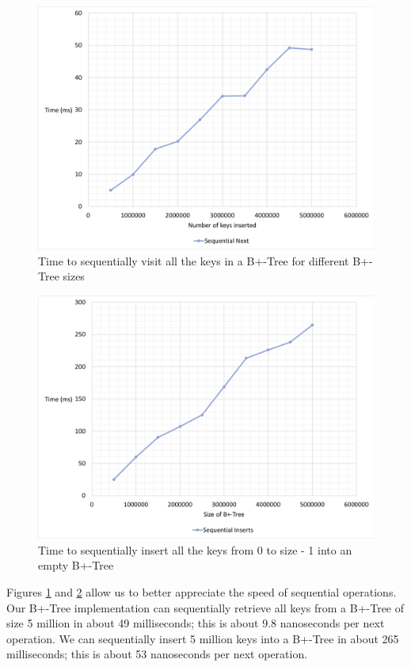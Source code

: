 \begin{figure}[htbp]
    \centering
    \includegraphics[scale=0.50]{figures/BtreeSequentialNextGraph.png}
    \caption{Time to sequentially visit all the keys in a B+-Tree for different B+-Tree sizes}
    \label{fig:B+GetsSequentialGraph}
\end{figure}

\begin{figure}[htbp]
    \centering
    \includegraphics[scale=0.50]{figures/BtreeSequentialnsertsGraph.png}
    \caption{Time to sequentially insert all the keys from 0 to size - 1 into an empty B+-Tree}
    \label{fig:B+PutsSequentialGraph}
\end{figure}

Figures \ref{fig:B+GetsSequentialGraph} and \ref{fig:B+PutsSequentialGraph} allow us to better appreciate the speed of sequential operations. Our B+-Tree implementation can sequentially retrieve all keys from a B+-Tree of size 5 million in about 49 milliseconds; this is about 9.8 nanoseconds per next operation. We can sequentially insert 5 million keys into a B+-Tree in about 265 milliseconds; this is about 53 nanoseconds per next operation. 

